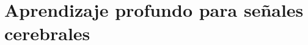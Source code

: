 \documentclass[11pt,spanish,listoffigures,listoftables]{tfgetsinf}
\begin{document}




\section{Aprendizaje profundo para señales cerebrales}

\end{document}
